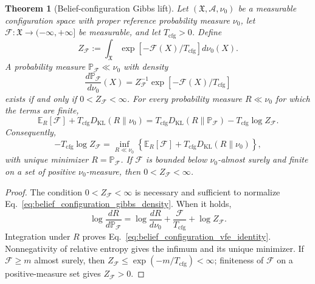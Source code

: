 \documentclass[11pt]{article}
\newtheorem{theorem}{Theorem}
\begin{document}
\begin{theorem}[Belief-configuration Gibbs lift]
\label{thm:belief_configuration_gibbs_lift}
Let $(\mathfrak{X},\mathcal{A},\nu_0)$ be a measurable configuration space with proper reference probability measure $\nu_0$, let $\mathcal{F}:\mathfrak{X}\to(-\infty,+\infty]$ be measurable, and let $T_{\mathrm{cfg}}>0$. Define
\begin{equation}
Z_{\mathcal{F}}
:=\int_{\mathfrak{X}}
\exp[-\mathcal{F}(X)/T_{\mathrm{cfg}}]d\nu_0(X).
\label{eq:belief_configuration_partition}
\end{equation}
A probability measure $\mathbb{P}_{\mathcal{F}}\ll\nu_0$ with density
\begin{equation}
\frac{d\mathbb{P}_{\mathcal{F}}}{d\nu_0}(X)
=Z_{\mathcal{F}}^{-1}
\exp[-\mathcal{F}(X)/T_{\mathrm{cfg}}]
\label{eq:belief_configuration_gibbs_density}
\end{equation}
exists if and only if $0<Z_{\mathcal{F}}<\infty$. For every probability measure $R\ll\nu_0$ for which the terms are finite,
\begin{equation}
\mathbb{E}_{R}[\mathcal{F}]
+T_{\mathrm{cfg}}D_{\mathrm{KL}}(R\|\nu_0)
=T_{\mathrm{cfg}}D_{\mathrm{KL}}(R\|\mathbb{P}_{\mathcal{F}})
-T_{\mathrm{cfg}}\log Z_{\mathcal{F}}.
\label{eq:belief_configuration_vfe_identity}
\end{equation}
Consequently,
\begin{equation}
-T_{\mathrm{cfg}}\log Z_{\mathcal{F}}
=\inf_{R\ll\nu_0}
\left\{
\mathbb{E}_{R}[\mathcal{F}]
+T_{\mathrm{cfg}}D_{\mathrm{KL}}(R\|\nu_0)
\right\},
\label{eq:belief_configuration_gibbs_variational_principle}
\end{equation}
with unique minimizer $R=\mathbb{P}_{\mathcal{F}}$. If $\mathcal{F}$ is bounded below $\nu_0$-almost surely and finite on a set of positive $\nu_0$-measure, then $0<Z_{\mathcal{F}}<\infty$.
\end{theorem}

\begin{proof}
The condition $0<Z_{\mathcal{F}}<\infty$ is necessary and sufficient to normalize Eq.~\eqref{eq:belief_configuration_gibbs_density}. When it holds,
\begin{equation}
\log\frac{dR}{d\mathbb{P}_{\mathcal{F}}}
=\log\frac{dR}{d\nu_0}
+\frac{\mathcal{F}}{T_{\mathrm{cfg}}}
+\log Z_{\mathcal{F}}.
\label{eq:gibbs_lift_radon_nikodym_identity}
\end{equation}
Integration under $R$ proves Eq.~\eqref{eq:belief_configuration_vfe_identity}. Nonnegativity of relative entropy gives the infimum and its unique minimizer. If $\mathcal{F}\ge m$ almost surely, then $Z_{\mathcal{F}}\le\exp(-m/T_{\mathrm{cfg}})<\infty$; finiteness of $\mathcal{F}$ on a positive-measure set gives $Z_{\mathcal{F}}>0$.
\end{proof}
\end{document}
